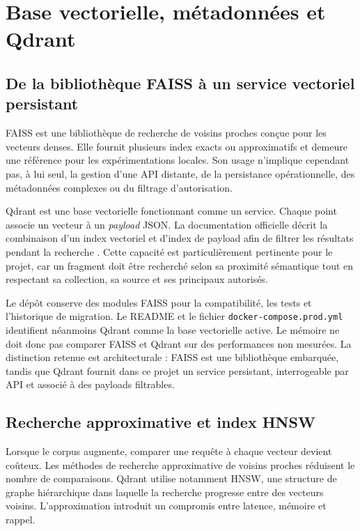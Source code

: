 \section{Base vectorielle, métadonnées et Qdrant}

\subsection{De la bibliothèque FAISS à un service vectoriel persistant}

FAISS est une bibliothèque de recherche de voisins proches conçue pour les vecteurs denses. Elle fournit plusieurs index exacts ou approximatifs et demeure une référence pour les expérimentations locales. Son usage n'implique cependant pas, à lui seul, la gestion d'une API distante, de la persistance opérationnelle, des métadonnées complexes ou du filtrage d'autorisation.

Qdrant est une base vectorielle fonctionnant comme un service. Chaque point associe un vecteur à un \textit{payload} JSON. La documentation officielle décrit la combinaison d'un index vectoriel et d'index de payload afin de filtrer les résultats pendant la recherche \citep{QdrantIndexing2026,QdrantFiltering2026}. Cette capacité est particulièrement pertinente pour le projet, car un fragment doit être recherché selon sa proximité sémantique tout en respectant sa collection, sa source et ses principaux autorisés.

Le dépôt conserve des modules FAISS pour la compatibilité, les tests et l'historique de migration. Le README et le fichier \texttt{docker-compose.prod.yml} identifient néanmoins Qdrant comme la base vectorielle active. Le mémoire ne doit donc pas comparer FAISS et Qdrant sur des performances non mesurées. La distinction retenue est architecturale : FAISS est une bibliothèque embarquée, tandis que Qdrant fournit dans ce projet un service persistant, interrogeable par API et associé à des payloads filtrables.

\subsection{Recherche approximative et index HNSW}

Lorsque le corpus augmente, comparer une requête à chaque vecteur devient coûteux. Les méthodes de recherche approximative de voisins proches réduisent le nombre de comparaisons. Qdrant utilise notamment HNSW, une structure de graphe hiérarchique dans laquelle la recherche progresse entre des vecteurs voisins. L'approximation introduit un compromis entre latence, mémoire et rappel.

